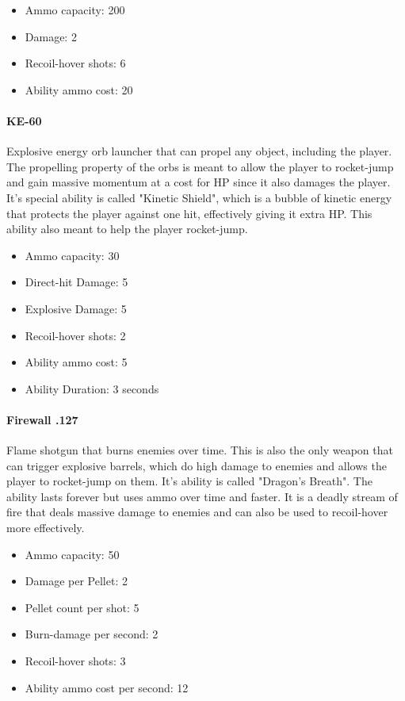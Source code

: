 \documentclass[12pt]{article}
\begin{document}
\begin{itemize}
	\item Ammo capacity: 200
	\item Damage: 2
	\item Recoil-hover shots: 6
	\item Ability ammo cost: 20
\end{itemize}


\paragraph{KE-60}

Explosive energy orb launcher that can propel any object, including the player. The propelling property of the orbs is meant to allow the player to rocket-jump and gain massive momentum at a cost for HP since it also damages the player. It's special ability is called "Kinetic Shield", which is a bubble of kinetic energy that protects the player against one hit, effectively giving it extra HP. This ability also meant to help the player rocket-jump. 

\begin{itemize}
	\item Ammo capacity: 30
	\item Direct-hit Damage: 5
	\item Explosive Damage: 5
	\item Recoil-hover shots: 2
	\item Ability ammo cost: 5
	\item Ability Duration: 3 seconds
\end{itemize} 


\paragraph{Firewall .127}

Flame shotgun that burns enemies over time. This is also the only weapon that can trigger explosive barrels, which do high damage to enemies and allows the player to rocket-jump on them. It's ability is called "Dragon's Breath". The ability lasts forever but uses ammo over time and faster. It is a deadly stream of fire that deals massive damage to enemies and can also be used to recoil-hover more effectively.

\begin{itemize}
	\item Ammo capacity: 50
	\item Damage per Pellet: 2
	\item Pellet count per shot: 5
	\item Burn-damage per second: 2
	\item Recoil-hover shots: 3
	\item Ability ammo cost per second: 12
\end{itemize} 
\end{document}
